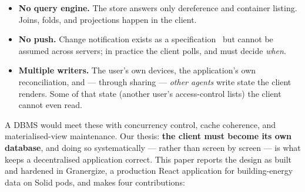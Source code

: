 \documentclass[11pt,a4paper]{article}
\theoremstyle{remark}
\begin{document}
\begin{itemize}
\item \textbf{No query engine.} The store answers only dereference and container
  listing. Joins, folds, and projections happen in the client.
\item \textbf{No push.} Change notification exists as a
  specification~\cite{solid-notifications} but cannot be assumed across servers;
  in practice the client polls, and must decide \emph{when}.
\item \textbf{Multiple writers.} The user's own devices, the application's own
  reconciliation, and --- through sharing --- \emph{other agents} write state the
  client renders. Some of that state (another user's access-control lists) the
  client cannot even read.
\end{itemize}

A DBMS would meet these with concurrency control, cache coherence, and
materialised-view maintenance. Our thesis: \textbf{the client must become its own
database}, and doing so systematically --- rather than screen by screen --- is
what keeps a decentralised application correct. This paper reports the design as
built and hardened in Granergize, a production React application for
building-energy data on Solid pods, and makes four contributions:
\end{document}
